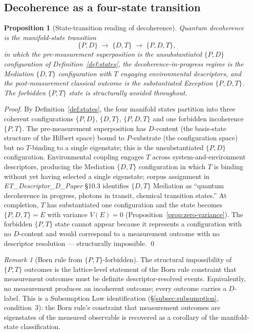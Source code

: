 \documentclass[11pt,a4paper]{article}
\newtheorem{proposition}[theorem]{Proposition}
\theoremstyle{definition}
\theoremstyle{remark}
\newtheorem{remark}[theorem]{Remark}
\begin{document}
\subsection{Decoherence as a four-state transition}\label{subsec:decoherence-states}

\begin{proposition}[State-transition reading of decoherence]\label{prop:decoherence-transition}
Quantum decoherence is the manifold-state transition
\[
\{P,D\} \;\longrightarrow\; \{D,T\} \;\longrightarrow\; \{P,D,T\},
\]
in which the pre-measurement superposition is the unsubstantiated $\{P,D\}$ configuration of Definition~\ref{def:states}, the decoherence-in-progress regime is the Mediation $\{D,T\}$ configuration with $T$ engaging environmental descriptors, and the post-measurement classical outcome is the substantiated Exception $\{P,D,T\}$. The forbidden $\{P,T\}$ state is structurally avoided throughout.
\end{proposition}

\begin{proof}
By Definition~\ref{def:states}, the four manifold states partition into three coherent configurations $\{P,D\}$, $\{D,T\}$, $\{P,D,T\}$ and one forbidden incoherence $\{P,T\}$. The pre-measurement superposition has $D$-content (the basis-state structure of the Hilbert space) bound to $P$-substrate (the configuration space) but no $T$-binding to a single eigenstate; this is the unsubstantiated $\{P,D\}$ configuration. Environmental coupling engages $T$ across system-and-environment descriptors, producing the Mediation $\{D,T\}$ configuration in which $T$ is binding without yet having selected a single eigenstate; corpus assignment in \textit{ET\_Descriptor\_D\_Paper} \S10.3 identifies $\{D,T\}$ Mediation as ``quantum decoherence in progress, photons in transit, chemical transition states.'' At completion, $T$ has substantiated one configuration and the state becomes $\{P,D,T\} = E$ with variance $V(E)=0$ (Proposition~\ref{prop:zero-variance}). The forbidden $\{P,T\}$ state cannot appear because it represents a configuration with no $D$-content and would correspond to a measurement outcome with no descriptor resolution --- structurally impossible. \qed
\end{proof}

\begin{remark}[Born rule from $\{P,T\}$-forbidden]\label{rem:born-rule}
The structural impossibility of $\{P,T\}$ outcomes is the lattice-level statement of the Born rule constraint that measurement outcomes must be definite descriptor-resolved events. Equivalently, no measurement produces an incoherent outcome; every outcome carries a $D$-label. This is a Subsumption Law identification (\S\ref{subsec:subsumption}, condition~3): the Born rule's constraint that measurement outcomes are eigenstates of the measured observable is recovered as a corollary of the manifold-state classification.
\end{remark}
\end{document}
